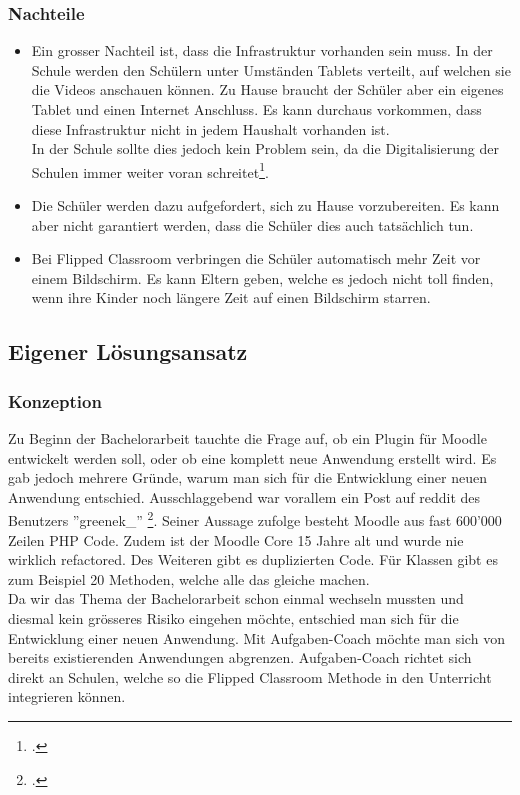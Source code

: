 \subsubsection*{Nachteile}
\begin{itemize}
	\item Ein grosser Nachteil ist, dass die Infrastruktur vorhanden sein muss. In der Schule werden den Schülern unter Umständen Tablets verteilt, auf welchen sie die Videos anschauen können. Zu Hause braucht der Schüler aber ein eigenes Tablet und einen Internet Anschluss. Es kann durchaus vorkommen, dass diese Infrastruktur nicht in jedem Haushalt vorhanden ist. \\
	In der Schule sollte dies jedoch kein Problem sein, da die Digitalisierung der Schulen immer weiter voran schreitet\footcite{digitale_schule}.
	\item Die Schüler werden dazu aufgefordert, sich zu Hause vorzubereiten. Es kann aber nicht garantiert werden, dass die Schüler dies auch tatsächlich tun.
	\item Bei Flipped Classroom verbringen die Schüler automatisch mehr Zeit vor einem Bildschirm. Es kann Eltern geben, welche es jedoch nicht toll finden, wenn ihre Kinder noch längere Zeit auf einen Bildschirm starren.
\end{itemize}

\subsection{Eigener Lösungsansatz}
\subsubsection{Konzeption}

Zu Beginn der Bachelorarbeit tauchte die Frage auf, ob ein Plugin für Moodle entwickelt werden soll, oder ob eine komplett neue Anwendung erstellt wird. Es gab jedoch mehrere Gründe, warum man sich für die Entwicklung einer neuen Anwendung entschied. Ausschlaggebend war vorallem ein Post auf reddit des Benutzers ''greenek\_'' \footcite{moodle_bericht}. Seiner Aussage zufolge besteht Moodle aus fast 600'000 Zeilen PHP Code. Zudem ist der Moodle Core 15 Jahre alt und wurde nie wirklich refactored. Des Weiteren gibt es duplizierten Code. Für Klassen gibt es zum Beispiel 20 Methoden, welche alle das gleiche machen. \\

Da wir das Thema der Bachelorarbeit schon einmal wechseln mussten und diesmal kein grösseres Risiko eingehen möchte, entschied man sich für die Entwicklung einer neuen Anwendung. Mit Aufgaben-Coach möchte man sich von bereits existierenden Anwendungen abgrenzen. Aufgaben-Coach richtet sich direkt an Schulen, welche so die Flipped Classroom Methode in den Unterricht integrieren können. \\


